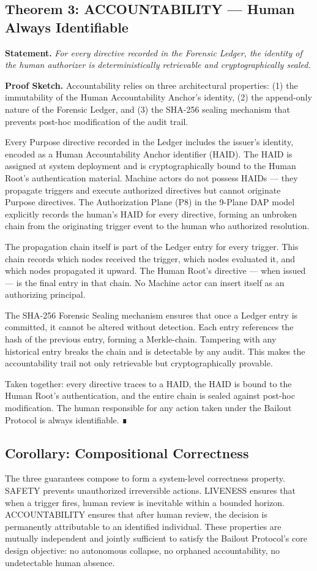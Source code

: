 \subsection{Theorem 3: ACCOUNTABILITY --- Human Always Identifiable}
\textbf{Statement.} \emph{For every directive recorded in the Forensic Ledger, the identity of the human authorizer is deterministically retrievable and cryptographically sealed.}

\textbf{Proof Sketch.}
Accountability relies on three architectural properties: (1) the immutability of the Human Accountability Anchor's identity, (2) the append-only nature of the Forensic Ledger, and (3) the SHA-256 sealing mechanism that prevents post-hoc modification of the audit trail.

Every Purpose directive recorded in the Ledger includes the issuer's identity, encoded as a Human Accountability Anchor identifier (HAID). The HAID is assigned at system deployment and is cryptographically bound to the Human Root's authentication material. Machine actors do not possess HAIDs --- they propagate triggers and execute authorized directives but cannot originate Purpose directives. The Authorization Plane (P8) in the 9-Plane DAP model explicitly records the human's HAID for every directive, forming an unbroken chain from the originating trigger event to the human who authorized resolution.

The propagation chain itself is part of the Ledger entry for every trigger. This chain records which nodes received the trigger, which nodes evaluated it, and which nodes propagated it upward. The Human Root's directive --- when issued --- is the final entry in that chain. No Machine actor can insert itself as an authorizing principal.

The SHA-256 Forensic Sealing mechanism ensures that once a Ledger entry is committed, it cannot be altered without detection. Each entry references the hash of the previous entry, forming a Merkle-chain. Tampering with any historical entry breaks the chain and is detectable by any audit. This makes the accountability trail not only retrievable but cryptographically provable.

Taken together: every directive traces to a HAID, the HAID is bound to the Human Root's authentication, and the entire chain is sealed against post-hoc modification. The human responsible for any action taken under the Bailout Protocol is always identifiable. ∎

\subsection{Corollary: Compositional Correctness}
The three guarantees compose to form a system-level correctness property. SAFETY prevents unauthorized irreversible actions. LIVENESS ensures that when a trigger fires, human review is inevitable within a bounded horizon. ACCOUNTABILITY ensures that after human review, the decision is permanently attributable to an identified individual. These properties are mutually independent and jointly sufficient to satisfy the Bailout Protocol's core design objective: no autonomous collapse, no orphaned accountability, no undetectable human absence.

